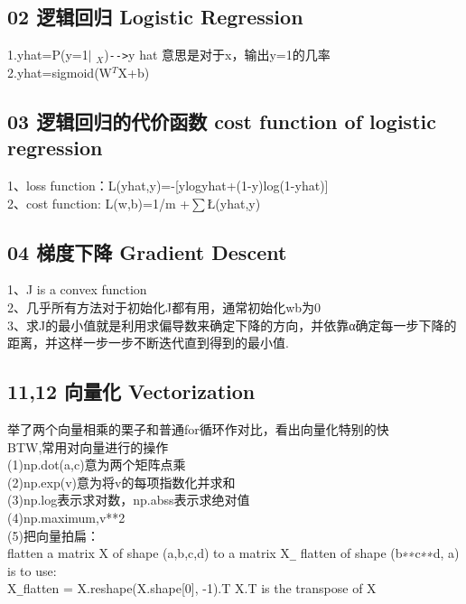 \documentclass[a4paper,12pt]{article}
\begin{document}
\begin{CJK*}{UTF8}{gbsn}
    \subsection{02 逻辑回归 Logistic Regression}
\begin{flushleft}
    1.yhat=P(y=1$|$ $_X$)\verb|-->|y hat 意思是对于x，输出y=1的几率\\
    2.yhat=sigmoid(W$^{T}$X+b)\\
\end{flushleft}   

    \subsection{03 逻辑回归的代价函数 cost function of logistic regression}
\begin{flushleft}   
    1、loss function：L(yhat,y)=-[ylogyhat+(1-y)log(1-yhat)]\\
    2、cost function: L(w,b)=1/m +$\sum$\L(yhat,y)\\
\end{flushleft} 
    \subsection{04 梯度下降 Gradient Descent}
\begin{flushleft}     
    1、J is a convex function\\
    2、几乎所有方法对于初始化J都有用，通常初始化wb为0\\
    3、求J的最小值就是利用求偏导数来确定下降的方向，并依靠α确定每一步下降的距离，并这样一步一步不断迭代直到得到的最小值.\\
\end{flushleft}  
    \subsection{11,12 向量化 Vectorization}
\begin{flushleft}

    
   举了两个向量相乘的栗子和普通for循环作对比，看出向量化特别的快\\
    BTW,常用对向量进行的操作\\   (1)np.dot(a,c)意为两个矩阵点乘\\
    					    (2)np.exp(v)意为将v的每项指数化并求和 \\
    					    (3)np.log表示求对数，np.abss表示求绝对值\\
    					    (4)np.maximum,v**2\\
                            (5)把向量拍扁：\\
                            flatten a matrix X of shape (a,b,c,d) to a matrix X\verb|_| flatten of shape    
                            (b∗∗c∗∗d, a) is to use:\\
                            X\verb|_|flatten = X.reshape(X.shape[0], -1).T     X.T is the transpose of X
\end{flushleft}

\end{CJK*}
\end{document}
